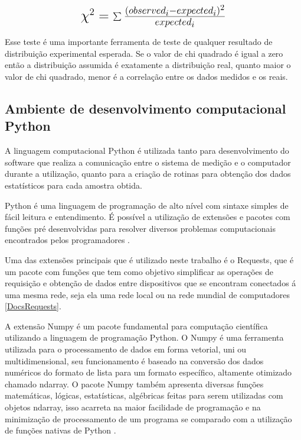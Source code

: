 \begin{equation}\label{eq:Eq_260}%
\mbox{\fontsize{17.28}{21.6}\selectfont\( %
\chi^{2} = \sum{\frac{(observed_i - expected_i)^{2}}{expected_i}}
\)} %
\end{equation}

%
%
%

\hfill

Esse teste é uma importante ferramenta de teste de qualquer resultado de distribuição experimental esperada. Se o valor de chi quadrado é igual a zero
então a distribuição assumida é exatamente a distribuição real, quanto maior o valor de chi quadrado, menor é a correlação entre os dados medidos e os reais. \autocite{Hollman2011}

\subsection{Ambiente de desenvolvimento computacional Python}

A linguagem computacional Python é utilizada tanto para desenvolvimento do software que realiza a comunicação entre o sistema de medição e o computador durante a utilização,
quanto para a criação de rotinas para obtenção dos dados estatísticos para cada amostra obtida.

Python é uma linguagem de programação de alto nível com sintaxe simples de fácil leitura e entendimento.
É possível a utilização de extensões e pacotes com funções pré desenvolvidas para resolver diversos problemas computacionais encontrados pelos programadores \autocite{TimHall2010}.

Uma das extensões principais que é utilizado neste trabalho é o Requests, que é um pacote com funções que tem como objetivo simplificar as operações de requisição e obtenção de dados entre dispositivos
que se encontram conectados á uma mesma rede, seja ela uma rede local ou na rede mundial de computadores \autoref{DocsRequests}.

A extensão Numpy é um pacote fundamental para computação científica utilizando a linguagem de programação Python.
O Numpy é uma ferramenta utilizada para o processamento de dados em forma vetorial, uni ou multidimensional, seu funcionamento é baseado na conversão dos dados numéricos do formato de lista para um
formato específico, altamente otimizado chamado ndarray.
O pacote Numpy também apresenta diversas funções matemáticas, lógicas, estatísticas, algébricas feitas para serem utilizadas com objetos ndarray, isso acarreta na maior facilidade de programação e
na minimização de processamento de um programa se comparado com a utilização de funções nativas de Python \autocite{DocsNumPy}.

